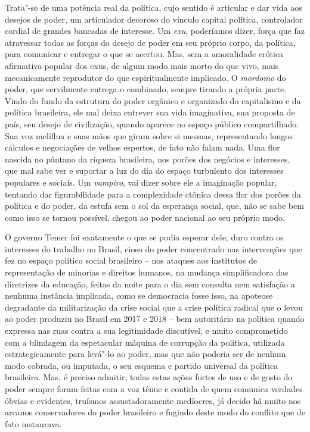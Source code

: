 Trata"-se de uma potência real da política, cujo sentido é articular e
dar vida aos desejos de poder, um articulador decoroso do vínculo
capital política, controlador cordial de grandes bancadas de interesse.
Um \emph{exu}, poderíamos dizer, força que faz atravessar todas as
forças do desejo de poder em seu próprio corpo, da política, para
comunicar e entregar o que se acertou. Mas, sem a amoralidade erótica
afirmativa popular dos exus, de algum modo mais morto do que vivo, mais
mecanicamente reprodutor do que espiritualmente implicado. O
\emph{mordomo} do poder, que servilmente entrega o combinado, sempre
tirando a própria parte. Vindo do fundo da estrutura do poder orgânico e
organizado do capitalismo e da política brasileira, ele mal deixa
entrever sua vida imaginativa, sua proposta de país, seu desejo de
civilização, quando aparece no espaço público compartilhado. Sua voz
melíflua e suas mãos que giram sobre si mesmas, representando longos
cálculos e negociações de velhos espertos, de fato não falam nada. Uma
flor nascida no pântano da riqueza brasileira, nos porões dos negócios e
interesses, que mal sabe ver e suportar a luz do dia do espaço
turbulento dos interesses populares e sociais. Um \emph{vampiro}, vai
dizer sobre ele a imaginação popular, tentando dar figurabilidade para a
complexidade ctônica dessa flor dos porões da política e do poder, da
estufa sem o sol da esperança social, que, não se sabe bem como isso se
tornou possível, chegou ao poder nacional ao seu próprio modo.

O governo Temer foi exatamente o que se podia esperar dele, duro contra
os interesses do trabalho no Brasil, cioso do poder concentrado nas
intervenções que fez no espaço político social brasileiro -- nos ataques
aos institutos de representação de minorias e direitos humanos, na
mudança simplificadora das diretrizes da educação, feitas da noite para
o dia sem consulta nem satisfação a nenhuma instância implicada, como se
democracia fosse isso, na apoteose degradante da militarização da crise
social que a crise política radical que o levou ao poder produziu no
Brasil em 2017 e 2018 -- bem autoritário na política quando expressa nas
ruas contra a sua legitimidade discutível, e muito comprometido com a
blindagem da espetacular máquina de corrupção da política, utilizada
estrategicamente para levá"-lo ao poder, mas que não poderia ser de
nenhum modo cobrada, ou imputada, o seu esquema e partido universal da
política brasileira. Mas, é preciso admitir, todas estas ações fortes de
uso e de gosto do poder sempre foram feitas com a voz tênue e contida de
quem comunica verdades óbvias e evidentes, truísmos assustadoramente
medíocres, já decido há muito nos arcanos conservadores do poder
brasileiro e fugindo deste modo do conflito que de fato instaurava.


